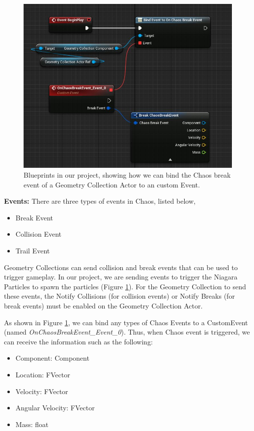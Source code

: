 \documentclass[sigconf]{acmart}
\begin{document}
\begin{figure}[ht]
  \centering
  \includegraphics[width=\linewidth]{aaafiles/event_blueprint.png}
  \caption{Blueprints in our project, showing how we can bind the Chaos break event of a Geometry Collection Actor to an custom Event. }
  \label{fig:chaos_event}
\end{figure}

\textbf{Events:} There are three types of events in Chaos, listed below,

\begin{itemize}
    \item Break Event
    \item Collision Event
    \item Trail Event
\end{itemize}

Geometry Collections can send collision and break events that can be used to trigger gameplay. In our project, we are sending events to trigger the Niagara Particles to spawn the particles (Figure \ref{fig:chaos_event}). For the Geometry Collection to send these events, the Notify Collisions (for collision events) or Notify Breaks (for break events) must be enabled on the Geometry Collection Actor. 

As shown in Figure \ref{fig:chaos_event}, we can bind any types of Chaos Events to a CustomEvent (named \textit{OnChaosBreakEvent\_Event\_0}). Thus, when Chaos event is triggered, we can receive the information such as the following:

\begin{itemize}
    \item Component: Component
    \item Location: FVector
    \item Velocity: FVector
    \item Angular Velocity: FVector
    \item Mass: float
\end{itemize}
\end{document}
